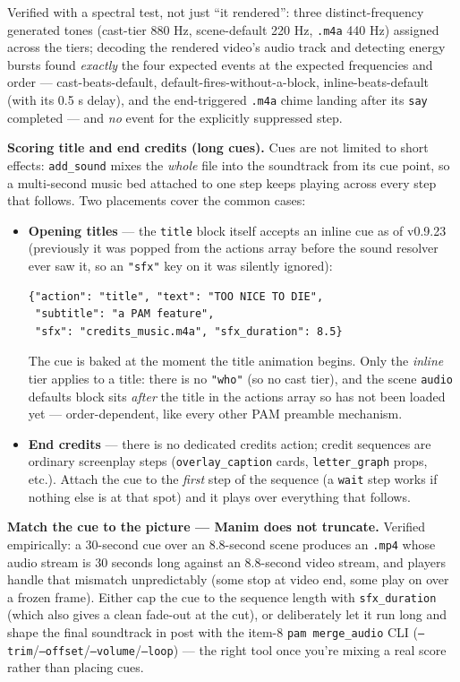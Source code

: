 \documentclass[
  11pt,
]{book}
\begin{document}
Verified with a spectral test, not just ``it rendered'': three
distinct-frequency generated tones (cast-tier 880 Hz, scene-default
220 Hz, \texttt{.m4a} 440 Hz) assigned across the tiers; decoding the
rendered video's audio track and detecting energy bursts found
\emph{exactly} the four expected events at the expected frequencies
and order --- cast-beats-default, default-fires-without-a-block,
inline-beats-default (with its 0.5 s delay), and the end-triggered
\texttt{.m4a} chime landing after its \texttt{say} completed --- and
\emph{no} event for the explicitly suppressed step.

\textbf{Scoring title and end credits (long cues).} Cues are not
limited to short effects: \texttt{add\_sound} mixes the \emph{whole}
file into the soundtrack from its cue point, so a multi-second music
bed attached to one step keeps playing across every step that
follows. Two placements cover the common cases:

\begin{itemize}
\item
  \textbf{Opening titles} --- the \texttt{title} block itself accepts
  an inline cue as of v0.9.23 (previously it was popped from the
  actions array before the sound resolver ever saw it, so an
  \texttt{"sfx"} key on it was silently ignored):

\begin{verbatim}
{"action": "title", "text": "TOO NICE TO DIE",
 "subtitle": "a PAM feature",
 "sfx": "credits_music.m4a", "sfx_duration": 8.5}
\end{verbatim}

  The cue is baked at the moment the title animation begins. Only the
  \emph{inline} tier applies to a title: there is no \texttt{"who"}
  (so no cast tier), and the scene \texttt{audio} defaults block sits
  \emph{after} the title in the actions array so has not been loaded
  yet --- order-dependent, like every other PAM preamble mechanism.
\item
  \textbf{End credits} --- there is no dedicated credits action;
  credit sequences are ordinary screenplay steps
  (\texttt{overlay\_caption} cards, \texttt{letter\_graph} props,
  etc.). Attach the cue to the \emph{first} step of the sequence (a
  \texttt{wait} step works if nothing else is at that spot) and it
  plays over everything that follows.
\end{itemize}

\textbf{Match the cue to the picture --- Manim does not truncate.}
Verified empirically: a 30-second cue over an 8.8-second scene
produces an \texttt{.mp4} whose audio stream is 30 seconds long
against an 8.8-second video stream, and players handle that mismatch
unpredictably (some stop at video end, some play on over a frozen
frame). Either cap the cue to the sequence length with
\texttt{sfx\_duration} (which also gives a clean fade-out at the cut),
or deliberately let it run long and shape the final soundtrack in
post with the item-8 \texttt{pam merge\_audio} CLI
(\texttt{--trim}/\texttt{--offset}/\texttt{--volume}/\texttt{--loop})
--- the right tool once you're mixing a real score rather than
placing cues.
\end{document}
